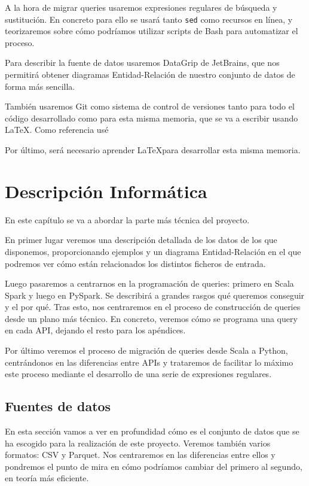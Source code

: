 \documentclass[12pt,twoside,titlepage]{report}
\begin{document}
A la hora de migrar queries usaremos expresiones regulares de búsqueda y sustitución. En concreto para ello se usará tanto \texttt{sed} como recursos en línea, y teorizaremos sobre cómo podríamos utilizar scripts de Bash para automatizar el proceso.

Para describir la fuente de datos usaremos DataGrip de JetBrains, que nos permitirá obtener diagramas Entidad-Relación de nuestro conjunto de datos de forma más sencilla.

También usaremos Git como sistema de control de versiones tanto para todo el código desarrollado como para esta misma memoria, que se va a escribir usando \LaTeX. Como referencia usé \cite{git}

Por último, será necesario aprender \LaTeX para desarrollar esta misma memoria.



\chapter{Descripción Informática}
\label{chap:contenidos}
\newpage

En este capítulo se va a abordar la parte más técnica del proyecto. 

En primer lugar veremos una descripción detallada de los datos de los que disponemos, proporcionando ejemplos y un diagrama Entidad-Relación en el que podremos ver cómo están relacionados los distintos ficheros de entrada.

Luego pasaremos a centrarnos en la programación de queries: primero en Scala Spark y luego en PySpark. Se describirá a grandes rasgos qué queremos conseguir y el por qué. Tras esto, nos centraremos en el proceso de construcción de queries desde un plano más técnico. En concreto, veremos cómo se programa una query en cada API, dejando el resto para los apéndices.

Por último veremos el proceso de migración de queries desde Scala a Python, centrándonos en las diferencias entre APIs y trataremos de facilitar lo máximo este proceso mediante el desarrollo de una serie de expresiones regulares.

\section{Fuentes de datos}

En esta sección vamos a ver en profundidad cómo es el conjunto de datos que se ha escogido para la realización de este proyecto. Veremos también varios formatos: CSV y Parquet. Nos centraremos en las diferencias entre ellos y pondremos el punto de mira en cómo podríamos cambiar del primero al segundo, en teoría más eficiente.
\end{document}
